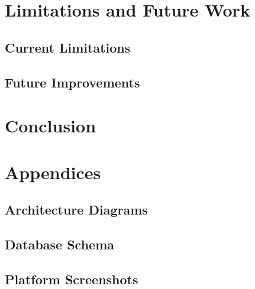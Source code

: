 \documentclass[11pt,a4paper]{article}
\begin{document}
\section{Limitations and Future Work}
\subsection{Current Limitations}
\subsection{Future Improvements}

\section{Conclusion}

\appendix

\section{Appendices}
\subsection{Architecture Diagrams}
\subsection{Database Schema}
\subsection{Platform Screenshots}
\end{document}

